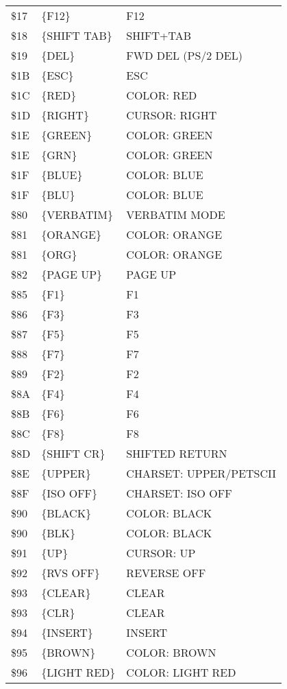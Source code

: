 \documentclass{article}
\begin{document}
\begin{longtable}[l]{l l l}
        \$17 & \{F12\} & F12\\
        \$18 & \{SHIFT TAB\} & SHIFT+TAB\\
        \$19 & \{DEL\} & FWD DEL (PS/2 DEL)\\
        \$1B & \{ESC\} & ESC\\
        \$1C & \{RED\} & COLOR: RED\\
        \$1D & \{RIGHT\} & CURSOR: RIGHT\\
        \$1E & \{GREEN\} & COLOR: GREEN\\
        \$1E & \{GRN\} & COLOR: GREEN\\
        \$1F & \{BLUE\} & COLOR: BLUE\\
        \$1F & \{BLU\} & COLOR: BLUE\\
        \$80 & \{VERBATIM\} & VERBATIM MODE\\
        \$81 & \{ORANGE\} & COLOR: ORANGE\\
        \$81 & \{ORG\} & COLOR: ORANGE\\
        \$82 & \{PAGE UP\} & PAGE UP\\
        \$85 & \{F1\} & F1\\
        \$86 & \{F3\} & F3\\
        \$87 & \{F5\} & F5\\
        \$88 & \{F7\} & F7\\
        \$89 & \{F2\} & F2\\
        \$8A & \{F4\} & F4\\
        \$8B & \{F6\} & F6\\
        \$8C & \{F8\} & F8\\
        \$8D & \{SHIFT CR\} & SHIFTED RETURN\\
        \$8E & \{UPPER\} & CHARSET: UPPER/PETSCII\\
        \$8F & \{ISO OFF\} & CHARSET: ISO OFF\\
        \$90 & \{BLACK\} & COLOR: BLACK\\
        \$90 & \{BLK\} & COLOR: BLACK\\
        \$91 & \{UP\} & CURSOR: UP\\
        \$92 & \{RVS OFF\} & REVERSE OFF\\
        \$93 & \{CLEAR\} & CLEAR\\
        \$93 & \{CLR\} & CLEAR\\
        \$94 & \{INSERT\} & INSERT\\
        \$95 & \{BROWN\} & COLOR: BROWN\\
        \$96 & \{LIGHT RED\} & COLOR: LIGHT RED\\

\end{longtable}
\end{document}
